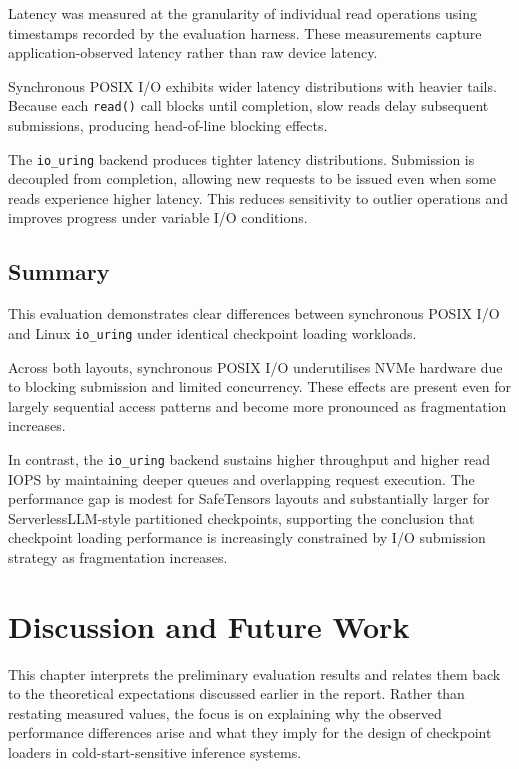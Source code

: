 \documentclass[]{final_report}
\begin{document}
Latency was measured at the granularity of individual read operations using timestamps recorded by the evaluation harness. These measurements capture application-observed latency rather than raw device latency.

Synchronous POSIX I/O exhibits wider latency distributions with heavier tails. Because each \texttt{read()} call blocks until completion, slow reads delay subsequent submissions, producing head-of-line blocking effects.

The \texttt{io\_uring} backend produces tighter latency distributions. Submission is decoupled from completion, allowing new requests to be issued even when some reads experience higher latency. This reduces sensitivity to outlier operations and improves progress under variable I/O conditions.

\section{Summary}

This evaluation demonstrates clear differences between synchronous POSIX I/O and Linux \texttt{io\_uring} under identical checkpoint loading workloads.

Across both layouts, synchronous POSIX I/O underutilises NVMe hardware due to blocking submission and limited concurrency. These effects are present even for largely sequential access patterns and become more pronounced as fragmentation increases.

In contrast, the \texttt{io\_uring} backend sustains higher throughput and higher read IOPS by maintaining deeper queues and overlapping request execution. The performance gap is modest for SafeTensors layouts and substantially larger for ServerlessLLM-style partitioned checkpoints, supporting the conclusion that checkpoint loading performance is increasingly constrained by I/O submission strategy as fragmentation increases.



\chapter{Discussion and Future Work}
\label{chap:discussion}

This chapter interprets the preliminary evaluation results and relates them back to the theoretical expectations discussed earlier in the report. Rather than restating measured values, the focus is on explaining why the observed performance differences arise and what they imply for the design of checkpoint loaders in cold-start-sensitive inference systems.
\end{document}
